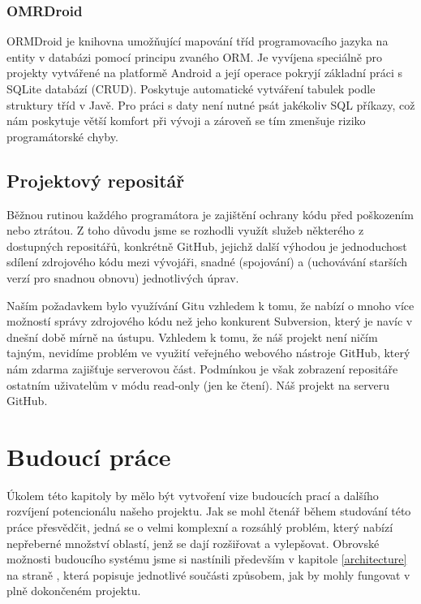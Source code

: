 \documentclass[thesis=M,czech]{FITthesis}[2012/06/26]
\begin{document}
\subsection{OMRDroid}\label{ormdroid}
ORMDroid je knihovna umožňující mapování tříd programovacího jazyka na entity v databázi pomocí principu zvaného ORM. Je vyvíjena speciálně pro projekty vytvářené na platformě Android a její operace pokryjí základní práci s SQLite databází (CRUD). Poskytuje automatické vytváření tabulek podle struktury tříd v Javě. Pro práci s daty není nutné psát jakékoliv SQL příkazy, což nám poskytuje větší komfort při vývoji a zároveň se tím zmenšuje riziko programátorské chyby.

\section{Projektový repositář}
Běžnou rutinou každého programátora je zajištění ochrany kódu před poškozením nebo ztrátou. Z toho důvodu jsme se rozhodli využít služeb některého z dostupných repositářů, konkrétně GitHub\cite{github}, jejichž další výhodou je jednoduchost sdílení zdrojového kódu mezi vývojáři, snadné  (spojování) a  (uchovávání starších verzí pro snadnou obnovu) jednotlivých úprav.

Naším požadavkem bylo využívání Gitu\cite{git} vzhledem k tomu, že nabízí o mnoho více možností správy zdrojového kódu než jeho konkurent Subversion\cite{svn}, který je navíc v dnešní době mírně na ústupu. Vzhledem k tomu, že náš projekt není ničím tajným, nevidíme problém ve využití veřejného webového nástroje GitHub\cite{github}, který nám zdarma zajišťuje serverovou část. Podmínkou je však zobrazení repositáře ostatním uživatelům v módu read-only (jen ke čtení). Náš projekt na serveru GitHub\cite{github_project}.

\chapter{Budoucí práce}
Úkolem této kapitoly by mělo být vytvoření vize budoucích prací a dalšího rozvíjení potencionálu našeho projektu. Jak se mohl čtenář během studování této práce přesvědčit, jedná se o velmi komplexní a rozsáhlý problém, který nabízí nepřeberné množství oblastí, jenž se dají rozšiřovat a vylepšovat. Obrovské možnosti budoucího systému jsme si nastínili především v kapitole \ref{architecture} na straně \pageref{architecture}, která popisuje jednotlivé součásti způsobem, jak by mohly fungovat v plně dokončeném projektu.
\end{document}
